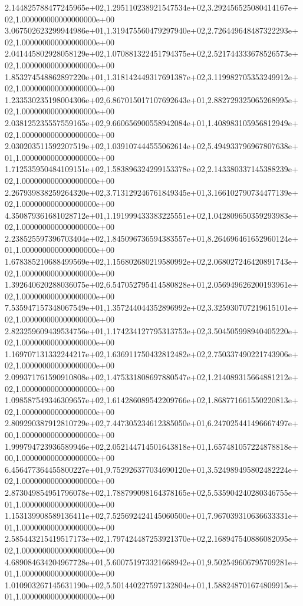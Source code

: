 2.144825788477245965e+02,1.295110238921547534e+02,3.292456525080414167e+02,1.000000000000000000e+00
3.067502623299944986e+01,1.319475560479297940e+02,2.726449648487322293e+02,1.000000000000000000e+00
2.041445802928058129e+02,1.070881322451794375e+02,2.521744333678526573e+02,1.000000000000000000e+00
1.853274548862897220e+01,1.318142449317691387e+02,3.119982705353249912e+02,1.000000000000000000e+00
1.233530235198004306e+02,6.867015017107692643e+01,2.882729325065268995e+02,1.000000000000000000e+00
2.038125235557559165e+02,9.660656900558942084e+01,1.408983105956812949e+02,1.000000000000000000e+00
2.030203511592207519e+02,1.039107444555062614e+02,5.494933796967807638e+01,1.000000000000000000e+00
1.712535950484109151e+02,1.583896324299153378e+02,2.143380337145388239e+02,1.000000000000000000e+00
2.267939838259264320e+02,3.713129246761849345e+01,3.166102790734477139e+02,1.000000000000000000e+00
4.350879361681028712e+01,1.191999433383225551e+02,1.042809650359293983e+02,1.000000000000000000e+00
2.238525597396703404e+02,1.845096736594383557e+01,8.264696461652960124e+01,1.000000000000000000e+00
1.678385210688499569e+02,1.156802680219580992e+02,2.068027246420891743e+02,1.000000000000000000e+00
1.392640620288036075e+02,6.547052795414580828e+01,2.056949626200193961e+02,1.000000000000000000e+00
7.535947157348067549e+01,1.357244044352896992e+02,3.325930707219615101e+02,1.000000000000000000e+00
2.823259609439534756e+01,1.174234127795313753e+02,3.504505998940405220e+02,1.000000000000000000e+00
1.169707131332244217e+02,1.636911750432812482e+02,2.750337490221743906e+02,1.000000000000000000e+00
2.099371761590910808e+02,1.475331808697880547e+02,1.214089315664881212e+02,1.000000000000000000e+00
1.098587549346309657e+02,1.614286089542209766e+02,1.868771661550220813e+02,1.000000000000000000e+00
2.809290387912810729e+02,7.447305234612385050e+01,6.247025441496667497e+00,1.000000000000000000e+00
1.999794723936589946e+02,2.052144714501643818e+01,1.657481057224878818e+00,1.000000000000000000e+00
6.456477364455800227e+01,9.752926377034690120e+01,3.524989495802482224e+02,1.000000000000000000e+00
2.873049854951796078e+02,1.788799098164378165e+02,5.535904240280346755e+01,1.000000000000000000e+00
1.153139908589136411e+02,7.525692424145060500e+01,7.967039310636633331e+01,1.000000000000000000e+00
2.585443215419517173e+02,1.797424487253921370e+02,2.168947540886082095e+02,1.000000000000000000e+00
4.689084634204967728e+01,5.600751973321668942e+01,9.502549606795709281e+01,1.000000000000000000e+00
1.010903267145631190e+02,5.501440227597132804e+01,1.588248701674809915e+01,1.000000000000000000e+00
